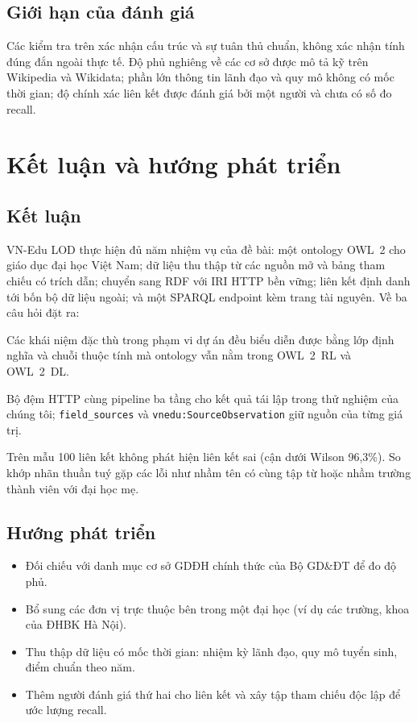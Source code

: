\documentclass[12pt,a4paper]{article}
\newcommand{\vn}[1]{\texttt{vnedu:\allowbreak #1}}
\newcommand{\RQ}[1]{\textbf{RQ#1}}
\begin{document}
\subsection{Giới hạn của đánh giá}
Các kiểm tra trên xác nhận cấu trúc và sự tuân thủ chuẩn, không xác nhận tính đúng đắn ngoài thực tế. Độ phủ nghiêng về
các cơ sở được mô tả kỹ trên Wikipedia và Wikidata; phần lớn thông tin lãnh đạo và quy mô không có mốc thời gian; độ chính
xác liên kết được đánh giá bởi một người và chưa có số đo recall.

\section{Kết luận và hướng phát triển}\label{sec:conclusion}

\subsection{Kết luận}
VN-Edu LOD thực hiện đủ năm nhiệm vụ của đề bài: một ontology OWL~2 cho giáo dục đại học Việt Nam; dữ liệu thu thập từ
các nguồn mở và bảng tham chiếu có trích dẫn; chuyển sang RDF với IRI HTTP bền vững; liên kết định danh tới bốn bộ dữ
liệu ngoài; và một SPARQL endpoint kèm trang tài nguyên. Về ba câu hỏi đặt ra:
\begin{description}[leftmargin=1.1cm,style=sameline]
  \item[\RQ{1}] Các khái niệm đặc thù trong phạm vi dự án đều biểu diễn được bằng lớp định nghĩa và chuỗi thuộc tính mà
  ontology vẫn nằm trong OWL~2~RL và OWL~2~DL.
  \item[\RQ{2}] Bộ đệm HTTP cùng pipeline ba tầng cho kết quả tái lập trong thử nghiệm của chúng tôi; \texttt{field\_sources}
  và \vn{SourceObservation} giữ nguồn của từng giá trị.
  \item[\RQ{3}] Trên mẫu 100 liên kết không phát hiện liên kết sai (cận dưới Wilson 96,3\%). So khớp nhãn thuần tuý gặp
  các lỗi như nhầm tên có cùng tập từ hoặc nhầm trường thành viên với đại học mẹ.
\end{description}

\subsection{Hướng phát triển}
\begin{itemize}
  \item Đối chiếu với danh mục cơ sở GDĐH chính thức của Bộ GD\&ĐT để đo độ phủ.
  \item Bổ sung các đơn vị trực thuộc bên trong một đại học (ví dụ các trường, khoa của ĐHBK Hà Nội).
  \item Thu thập dữ liệu có mốc thời gian: nhiệm kỳ lãnh đạo, quy mô tuyển sinh, điểm chuẩn theo năm.
  \item Thêm người đánh giá thứ hai cho liên kết và xây tập tham chiếu độc lập để ước lượng recall.
\end{itemize}
\end{document}
